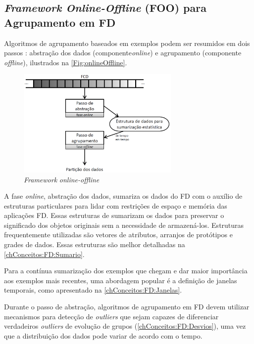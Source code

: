
\subsection{\emph{Framework Online-Offline} (FOO) para Agrupamento em FD} \label{ChAFD:framework}

Algoritmos de agrupamento baseados em exemplos podem ser resumidos em dois passos \cite{Cao2006,Yang2006}: abstração dos dados (componente\emph{online}) e agrupamento (componente \emph{offline}), ilustrados na \autoref{Fig:onlineOffline}.

\begin{figure}[!htb]
	\centering
	\includegraphics[width=0.7\textwidth]{figures/onlineOffline}
	\caption{\emph{Framework} \emph{online-offline} \cite{Silva2013}}\label{Fig:onlineOffline}
\end{figure}

A fase \emph{online}, abstração dos dados, sumariza os dados do FD com o auxílio de estruturas particulares para lidar com restrições de espaço e memória das aplicações FD. Essas estruturas de sumarizam os dados para preservar o significado dos objetos originais sem a necessidade de armazená-los. Estruturas frequentemente utilizadas são vetores de atributos, arranjos de protótipos e grades de dados. Essas estruturas são melhor detalhadas na \autoref{chConceitos:FD:Sumario}.

Para a contínua sumarização dos exemplos que chegam e dar maior importância aos exemplos mais recentes, uma abordagem popular é a definição de janelas temporais, como apresentado na \autoref{chConceitos:FD:Janelas}.

Durante o passo de abstração, algoritmos de agrupamento em FD devem utilizar mecanismos para detecção de \emph{outliers} que sejam capazes de diferenciar verdadeiros \emph{outliers} de evolução de grupos (\autoref{chConceitos:FD:Desvios}), uma vez que a distribuição dos dados pode variar de acordo com o tempo.

